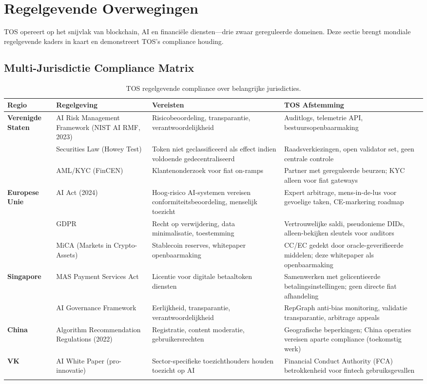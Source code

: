 \documentclass[11pt]{article}
\begin{document}
\section{Regelgevende Overwegingen}
\label{sec:regulatory}

TOS opereert op het snijvlak van blockchain, AI en financiële diensten—drie zwaar gereguleerde domeinen. Deze sectie brengt mondiale regelgevende kaders in kaart en demonstreert TOS's compliance houding.

\subsection{Multi-Jurisdictie Compliance Matrix}

\begin{longtable}{@{}p{}p{}p{}p{}@{}}
\toprule
\textbf{Regio} & \textbf{Regelgeving} & \textbf{Vereisten} & \textbf{TOS Afstemming} \\\midrule
\textbf{Verenigde Staten} & AI Risk Management Framework (NIST AI RMF, 2023) & Risicobeoordeling, transparantie, verantwoordelijkheid & Auditlogs, telemetrie API, bestuursopenbaarmaking \\
 & Securities Law (Howey Test) & Token niet geclassificeerd als effect indien voldoende gedecentraliseerd & Raadsverkiezingen, open validator set, geen centrale controle \\
 & AML/KYC (FinCEN) & Klantenonderzoek voor fiat on-ramps & Partner met gereguleerde beurzen; KYC alleen voor fiat gateways \\
\textbf{Europese Unie} & AI Act (2024) & Hoog-risico AI-systemen vereisen conformiteitsbeoordeling, menselijk toezicht & Expert arbitrage, mens-in-de-lus voor gevoelige taken, CE-markering roadmap \\
 & GDPR & Recht op verwijdering, data minimalisatie, toestemming & Vertrouwelijke saldi, pseudonieme DIDs, alleen-bekijken sleutels voor auditors \\
 & MiCA (Markets in Crypto-Assets) & Stablecoin reserves, whitepaper openbaarmaking & CC/EC gedekt door oracle-geverifieerde middelen; deze whitepaper als openbaarmaking \\
\textbf{Singapore} & MAS Payment Services Act & Licentie voor digitale betaaltoken diensten & Samenwerken met gelicentieerde betalingsinstellingen; geen directe fiat afhandeling \\
 & AI Governance Framework & Eerlijkheid, transparantie, verantwoordelijkheid & RepGraph anti-bias monitoring, validatie transparantie, arbitrage appeals \\
\textbf{China} & Algorithm Recommendation Regulations (2022) & Registratie, content moderatie, gebruikersrechten & Geografische beperkingen; China operaties vereisen aparte compliance (toekomstig werk) \\
\textbf{VK} & AI White Paper (pro-innovatie) & Sector-specifieke toezichthouders houden toezicht op AI & Financial Conduct Authority (FCA) betrokkenheid voor fintech gebruiksgevallen \\
\bottomrule
\caption{TOS regelgevende compliance over belangrijke jurisdicties.}
\end{longtable}
\end{document}
